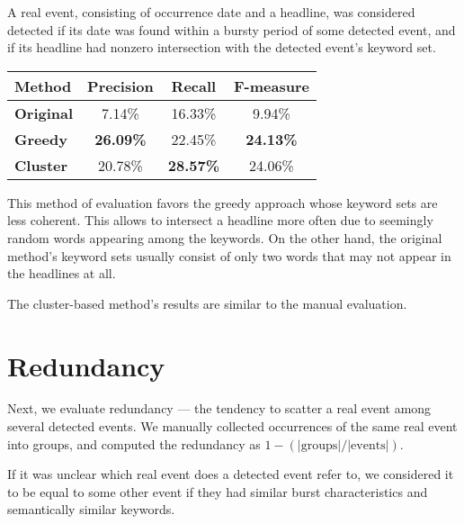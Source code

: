 A real event, consisting of occurrence date and a headline, was considered detected if its date was found within a bursty period of some detected event, and if its headline had nonzero intersection with the detected event's keyword set.

\hspace{\fill}

\begin{minipage}{\linewidth}
\centering
\begin{tabular}{ l c c c }\toprule[1.5pt]
\bf Method 	 & \bf Precision & \bf Recall & \bf F-measure \\ \midrule
\bf Original &  7.14\%     & 16.33\%     &  9.94\% \\
\bf Greedy   &  \bf 26.09\%     & 22.45\%      &  \bf 24.13\% \\
\bf Cluster &  20.78\%     & \bf 28.57\%      &  24.06\% \\ \bottomrule[1.25pt]
\end {tabular}\par
{} \label{tab:title} 
\end{minipage}

\hspace{\fill}

This method of evaluation favors the greedy approach whose keyword sets are less coherent. This allows to intersect a headline more often due to seemingly random words appearing among the keywords. On the other hand, the original method's keyword sets usually consist of only two words that may not appear in the headlines at all.

The cluster-based method's results are similar to the manual evaluation.

\section{Redundancy} \label{sec:redundancy}

Next, we evaluate redundancy --- the tendency to scatter a real event among several detected events. We manually collected occurrences of the same real event into groups, and computed the redundancy as $1 - (\left| \text{groups} \right| / \left| \text{events} \right|)$.

If it was unclear which real event does a detected event refer to, we considered it to be equal to some other event if they had similar burst characteristics and semantically similar keywords.

